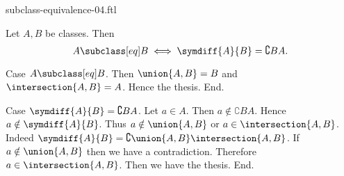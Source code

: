 \documentclass{article}
\begin{document}
\begin{smodule}[creators={Marcel Schütz}]{subclass-equivalence-04.ftl}

  \begin{fproposition*}[label=2556239837921280]
    Let $A, B$ be classes.
    Then \[A \subclass[eq] B \iff \symdiff{A}{B} = \complement{B}{A}.\]
  \end{fproposition*}
  \begin{fproof}
    Case $A \subclass[eq] B$.
      Then $\union{A,B} = B$ and $\intersection{A,B} = A$.
      Hence the thesis.
    End.

    Case $\symdiff{A}{B} = \complement{B}{A}$.
      Let $a \in A$.
      Then $a \notin \complement{B}{A}$.
      Hence $a \notin \symdiff{A}{B}$.
      Thus $a \notin \union{A,B}$ or $a \in \intersection{A,B}$.
      Indeed $\symdiff{A}{B} = \complement{\union{A,B}}{\intersection{A,B}}$.
      If $a \notin \union{A,B}$ then we have a contradiction.
      Therefore $a \in \intersection{A,B}$.
      Then we have the thesis.
    End.
  \end{fproof}
\end{smodule}
\end{document}
